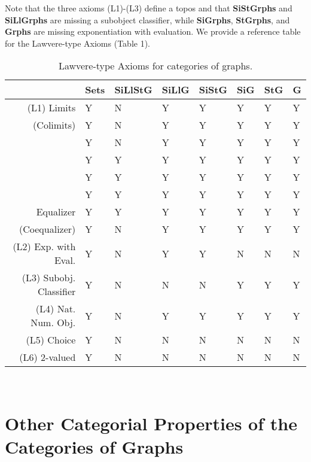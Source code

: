 \documentclass[11pt]{article}
\begin{document}
\indent Note that the three axioms (L1)-(L3) define a topos and that \textbf{SiStGrphs} and \textbf{SiLlGrphs} are missing a subobject classifier, while \textbf{SiGrphs}, \textbf{StGrphs}, and \textbf{Grphs} are missing exponentiation with evaluation. We provide a reference table for the Lawvere-type Axioms (Table 1).\\
\begin{table}[h]
\caption{Lawvere-type Axioms for categories of graphs.}
\begin{tabular}{ r || l || l | l | l | l | l | l | }			
  \quad & \textbf{Sets} & \textbf{SiLlStG} & \textbf{SiLlG} & \textbf{SiStG} & \textbf{SiG} & \textbf{StG} & \textbf{G} \\
\hline
\hline
 (L1) Limits & Y & N & Y & Y & Y & Y & Y \\
\hline  
  (Colimits) & Y & N & Y & Y & Y & Y & Y \\
\hdashline
   & Y & N & Y & Y & Y & Y & Y \\
\hline 
   & Y & Y & Y & Y & Y & Y & Y \\
\hline 
   & Y & Y & Y & Y & Y & Y & Y  \\
\hline 
   & Y & Y & Y & Y & Y & Y & Y \\
\hline 
  Equalizer & Y & Y & Y & Y & Y & Y & Y \\
\hline 
  (Coequalizer) & Y & N & Y & Y & Y & Y & Y \\
\hline 
\hline
 (L2) Exp. with Eval. & Y & N & Y & Y & N & N & N \\
\hline 
\hline
 (L3) Subobj. Classifier & Y & N & N & N & Y & Y & Y \\
\hline 
\hline
\hline
 (L4) Nat. Num. Obj. & Y & N & Y & Y & Y & Y & Y \\
\hline 
\hline
 (L5) Choice & Y & N & N & N & N & N & N \\
\hline 
\hline
 (L6) 2-valued & Y & N & N & N & N & N & N \\
\hline 
\end{tabular}
\end{table}
\\
\section{Other Categorial Properties of the Categories of Graphs}
\end{document}
